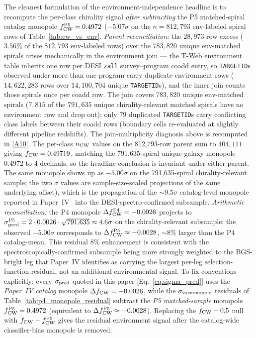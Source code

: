 \documentclass[aps,prd,twocolumn,superscriptaddress,showpacs,preprintnumbers,nofootinbib,longbibliography,floatfix]{revtex4-2}
\newcommand{\repoBase}{https://github.com/Hubify-Projects/bigbounce/blob/main}
\begin{document}
The cleanest
formulation of the environment-independence headline is to recompute
the per-class chirality signal \emph{after subtracting} the P5
matched-spiral catalog monopole $f_{\rm CW}^{\rm P5} = 0.4972$
($-5.07\sigma$ on the $n = 812{,}793$ env-labeled spiral rows of
Table~\ref{tab:cw_vs_env}. \emph{Parent reconciliation:} the
$28{,}973$-row excess ($3.56\%$ of the $812{,}793$ env-labeled rows) over the $783{,}820$ unique
env-matched spirals arises mechanically in the
environment join — the T-Web environment table inherits one row per
DESI \texttt{zall} survey--program coadd entry, so \texttt{TARGETID}s
observed under more than one program carry duplicate environment rows
($14{,}622{,}283$ rows over $14{,}100{,}704$ unique
\texttt{TARGETID}s), and the inner join counts those spirals once per
coadd row. The join covers $783{,}820$ unique env-matched spirals
($7{,}815$ of the $791{,}635$ unique chirality-relevant matched spirals have no environment row and drop out); only $79$
duplicated \texttt{TARGETID}s carry conflicting class labels between
their coadd rows (boundary cells re-evaluated at slightly different
pipeline redshifts). The join-multiplicity diagnosis above is recomputed in
\href{\repoBase/pipelines/p5\_desi\_chirality/outputs/17\_v0151\_closure\_recomputes.json}{[A10]}. The per-class
$n_{\rm CW}$ values on the 812{,}793-row parent sum to
$404{,}111$ giving $f_{\rm CW} = 0.49719$, matching the 791{,}635-spiral
unique-galaxy monopole $0.4972$ to 4 decimals, so the headline
conclusion is
invariant under either parent. The same monopole shows up as
$-5.00\sigma$ on the
791{,}635-spiral chirality-relevant sample; the two $\sigma$ values
are sample-size-scaled projections of the same underlying offset),
which is the propagation of the
$\sim\!9.5\sigma$ catalog-level monopole reported in
Paper~IV~\cite{golden_chirality_2026} into the DESI-spectro-confirmed
subsample. \emph{Arithmetic reconciliation:} the P4 monopole
$\Delta f_{\rm CW}^{\rm P4} = -0.0026$ projects to
$\sigma_{\rm pred}^{\rm P5} = 2 \cdot 0.0026 \cdot \sqrt{791{,}635}
\approx 4.6\sigma$ on the chirality-relevant subsample; the observed
$-5.00\sigma$ corresponds to $\Delta f_{\rm CW}^{\rm P5} \approx
-0.0028$, ${\sim}8\%$ larger than the P4 catalog-mean. This residual
$8\%$ enhancement is consistent with the spectroscopically-confirmed
subsample being more strongly weighted to the BGS-bright leg that
Paper~IV identifies as carrying the largest per-leg
selection-function residual, not an additional environmental signal.
To fix conventions explicitly: every $\sigma_{\rm pred}$ quoted in
this paper [Eq.~\eqref{eq:sigma_pred}] uses the \emph{Paper~IV
catalog} monopole $\Delta f_{\rm CW} = -0.0026$, while the
$\sigma_{\rm vs\,monopole}$ residuals of
Table~\ref{tab:p4_monopole_residual} subtract the \emph{P5
matched-sample} monopole $f_{\rm CW}^{\rm P5} = 0.4972$ (equivalent
to $\Delta f_{\rm CW}^{\rm P5} \approx -0.0028$). Replacing the $f_{\rm CW} - 0.5$ null with
$f_{\rm CW} - f_{\rm CW}^{\rm P5}$ gives the residual environment
signal after the catalog-wide classifier-bias monopole is removed:
\end{document}
